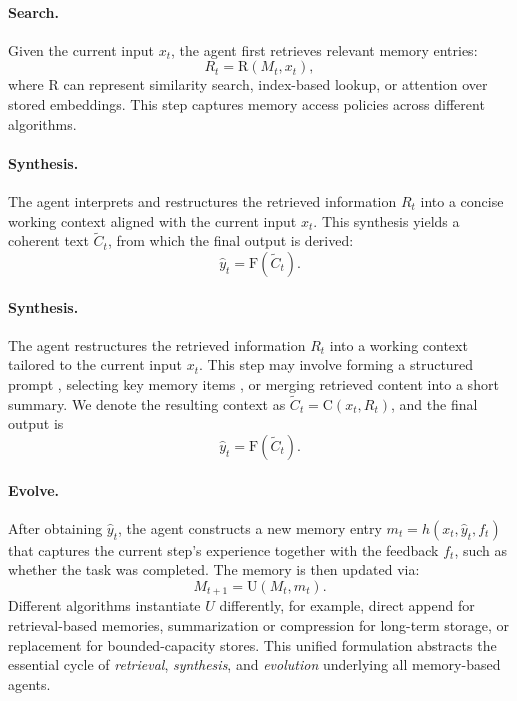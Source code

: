 \paragraph{Search.}  
Given the current input $x_t$, the agent first retrieves relevant memory entries:  
\[
R_t = \text{R}(M_t, x_t),
\]
where $\text{R}$ can represent similarity search, index-based lookup, or attention over stored embeddings. This step captures memory access policies across different algorithms.

\paragraph{Synthesis.}  
The agent interprets and restructures the retrieved information $R_t$ into a concise working context aligned with the current input $x_t$.  
This synthesis yields a coherent text $\tilde{C}_t$, from which the final output is derived:
\[
\hat{y}_t = \text{F}(\tilde{C}_t).
\]

\paragraph{Synthesis.}
The agent restructures the retrieved information \(R_t\) into a working context tailored to the current input \(x_t\).  
This step may involve forming a structured prompt \citep{Wang2024AgentWM}, selecting key memory items \citep{mem0,xu2025mem}, or merging retrieved content \citep{suzgun2025dynamic} into a short summary.  
We denote the resulting context as \(\tilde{C}_t = \text{C}(x_t, R_t)\), and the final output is
\[
\hat{y}_t = \text{F}(\tilde{C}_t).
\]



\paragraph{Evolve.}  

After obtaining \(\hat{y}_t\), the agent constructs a new memory entry
\(m_t = h(x_t, \hat{y}_t, f_t)\) that captures the current step’s experience together with the feedback \(f_t\), such as whether the task was completed. The memory is then updated via:
\[
M_{t+1} = \text{U}(M_t, m_t).
\]
Different algorithms instantiate $U$ differently, for example, direct append for retrieval-based memories, summarization or compression for long-term storage, or replacement for bounded-capacity stores.  
This unified formulation abstracts the essential cycle of \emph{retrieval}, \emph{synthesis}, and \emph{evolution} underlying all memory-based agents.

